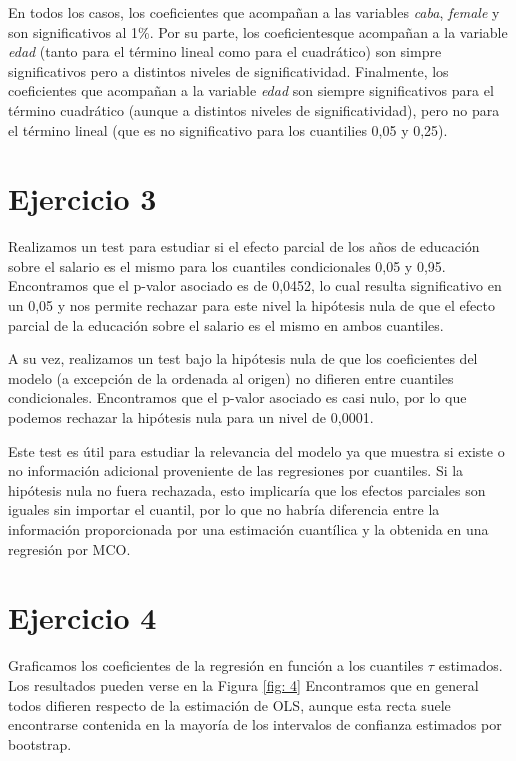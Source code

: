 \documentclass[11pt]{article}
\begin{document}
En todos los casos, los coeficientes que acompañan a las variables \emph{caba}, \emph{female} y son significativos al 1\%. Por su parte, los coeficientesque acompañan a la variable \emph{edad} (tanto para el término lineal como para el cuadrático) son simpre significativos pero a distintos niveles de significatividad. Finalmente, los coeficientes que acompañan a la variable \emph{edad} son siempre significativos para el término cuadrático (aunque a distintos niveles de significatividad), pero no para el término lineal (que es no significativo para los cuantilies 0,05 y 0,25). 

\section*{Ejercicio 3}

Realizamos un test para estudiar si el efecto parcial de los años de educación sobre el salario es el mismo para los cuantiles condicionales 0,05 y 0,95. Encontramos que el p-valor asociado es de 0,0452, lo cual resulta significativo en un 0,05 y nos permite rechazar para este nivel la hipótesis nula de que el efecto parcial de la educación sobre el salario es el mismo en ambos cuantiles.

A su vez, realizamos un test bajo la hipótesis nula de que los coeficientes del modelo (a excepción de la ordenada al origen) no difieren entre cuantiles condicionales. Encontramos que el p-valor asociado es casi nulo, por lo que podemos rechazar la hipótesis nula para un nivel de 0,0001. 

Este test es útil para estudiar la relevancia del modelo ya que muestra si existe o no información adicional proveniente de las regresiones por cuantiles. Si la hipótesis nula no fuera rechazada, esto implicaría que los efectos parciales son iguales sin importar el cuantil, por lo que no habría diferencia entre la información proporcionada por una estimación cuantílica y la obtenida en una regresión por MCO.

\section*{Ejercicio 4}

Graficamos los coeficientes de la regresión en función a los cuantiles $\tau$ estimados. Los resultados pueden verse en la Figura \ref{fig: 4} Encontramos que en general todos difieren respecto de la estimación de OLS, aunque esta recta suele encontrarse contenida en la mayoría de los intervalos de confianza estimados por bootstrap. 
\end{document}

